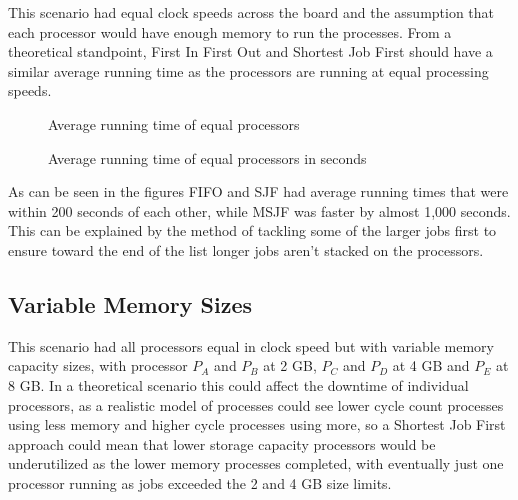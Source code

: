 \documentclass[12pt]{article}
\begin{document}
  This scenario had equal clock speeds across the board and the assumption that each processor would have enough memory to run the processes. From a theoretical standpoint, First In First Out and Shortest Job First should have a similar average running time as the processors are running at equal processing speeds.

  \begin{figure}[h!]\CenterFloatBoxes
  \begin{floatrow}
    {\caption{Average running time of equal processors}}
    \killfloatstyle{}
    {\caption{Average running time of equal processors in seconds}}
  \end{floatrow}
  \end{figure}

  As can be seen in the figures FIFO and SJF had average running times that were within 200 seconds of each other, while MSJF was faster by almost 1,000 seconds. This can be explained by the method of tackling some of the larger jobs first to ensure toward the end of the list longer jobs aren't stacked on the processors.

  \subsection{Variable Memory Sizes}

  This scenario had all processors equal in clock speed but with variable memory capacity sizes, with processor $P_A$ and $P_B$ at 2 GB, $P_C$ and $P_D$ at 4 GB and $P_E$ at 8 GB. In a theoretical scenario this could affect the downtime of individual processors, as a realistic model of processes could see lower cycle count processes using less memory and higher cycle processes using more, so a Shortest Job First approach could mean that lower storage capacity processors would be underutilized as the lower memory processes completed, with eventually just one processor running as jobs exceeded the 2 and 4 GB size limits.
\end{document}

